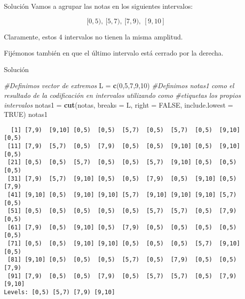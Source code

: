 \documentclass[
  ignorenonframetext,
]{beamer}
\newenvironment{Shaded}{\begin{snugshade}}{\end{snugshade}}
\newcommand{\CommentTok}[1]{\textcolor[rgb]{0.56,0.35,0.01}{\textit{#1}}}
\newcommand{\DataTypeTok}[1]{\textcolor[rgb]{0.13,0.29,0.53}{#1}}
\newcommand{\DecValTok}[1]{\textcolor[rgb]{0.00,0.00,0.81}{#1}}
\newcommand{\KeywordTok}[1]{\textcolor[rgb]{0.13,0.29,0.53}{\textbf{#1}}}
\newcommand{\NormalTok}[1]{#1}
\newcommand{\OtherTok}[1]{\textcolor[rgb]{0.56,0.35,0.01}{#1}}
\newcommand{\StringTok}[1]{\textcolor[rgb]{0.31,0.60,0.02}{#1}}
\begin{document}
\begin{frame}{Solución}
\protect\hypertarget{soluciuxf3n-16}{}
Vamos a agrupar las notas en los siguientes intervalos:

\[[0,5),\ [5,7),\ [7,9),\ [9,10]\]

Claramente, estos 4 intervalos no tienen la misma amplitud.

Fijémonos también en que el último intervalo está cerrado por la
derecha.
\end{frame}

\begin{frame}[fragile]{Solución}
\protect\hypertarget{soluciuxf3n-17}{}
\begin{Shaded}
\begin{Highlighting}[]
\CommentTok{\#Definimos vector de extremos}
\NormalTok{L =}\StringTok{ }\KeywordTok{c}\NormalTok{(}\DecValTok{0}\NormalTok{,}\DecValTok{5}\NormalTok{,}\DecValTok{7}\NormalTok{,}\DecValTok{9}\NormalTok{,}\DecValTok{10}\NormalTok{)}
\CommentTok{\#Definimos notas1 como el resultado de la codificación en intervalos utilizando como }
\CommentTok{\#etiquetas los propios intervalos}
\NormalTok{notas1 =}\StringTok{ }\KeywordTok{cut}\NormalTok{(notas, }\DataTypeTok{breaks =}\NormalTok{ L, }\DataTypeTok{right =} \OtherTok{FALSE}\NormalTok{, }\DataTypeTok{include.lowest =} \OtherTok{TRUE}\NormalTok{)}
\NormalTok{notas1}
\end{Highlighting}
\end{Shaded}

\begin{verbatim}
  [1] [7,9)  [9,10] [0,5)  [0,5)  [5,7)  [0,5)  [5,7)  [0,5)  [9,10] [0,5) 
 [11] [7,9)  [5,7)  [0,5)  [7,9)  [0,5)  [0,5)  [9,10] [0,5)  [9,10] [0,5) 
 [21] [0,5)  [0,5)  [5,7)  [0,5)  [0,5)  [5,7)  [9,10] [0,5)  [0,5)  [0,5) 
 [31] [7,9)  [5,7)  [9,10] [0,5)  [0,5)  [7,9)  [0,5)  [9,10] [0,5)  [7,9) 
 [41] [9,10] [0,5)  [9,10] [9,10] [5,7)  [9,10] [9,10] [9,10] [5,7)  [0,5) 
 [51] [0,5)  [0,5)  [0,5)  [0,5)  [0,5)  [5,7)  [5,7)  [0,5)  [7,9)  [0,5) 
 [61] [7,9)  [0,5)  [9,10] [0,5)  [7,9)  [0,5)  [0,5)  [0,5)  [0,5)  [0,5) 
 [71] [0,5)  [0,5)  [9,10] [9,10] [0,5)  [0,5)  [0,5)  [5,7)  [9,10] [0,5) 
 [81] [9,10] [0,5)  [0,5)  [0,5)  [5,7)  [0,5)  [7,9)  [0,5)  [0,5)  [7,9) 
 [91] [7,9)  [0,5)  [0,5)  [7,9)  [0,5)  [5,7)  [5,7)  [0,5)  [7,9)  [9,10]
Levels: [0,5) [5,7) [7,9) [9,10]
\end{verbatim}
\end{frame}
\end{document}
